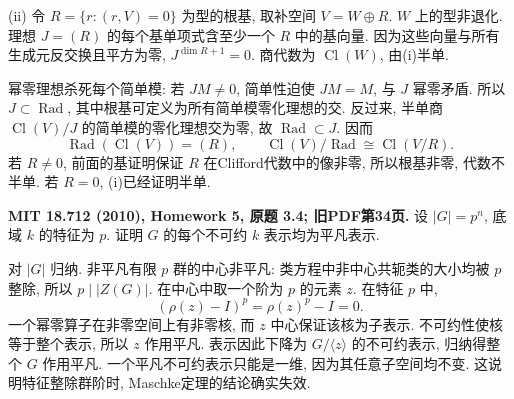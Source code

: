 \begin{solution}
(ii) 令 $R=\{r:(r,V)=0\}$ 为型的根基, 取补空间 $V=W\oplus R$. $W$ 上的型非退化. 理想 $J=(R)$ 的每个基单项式含至少一个 $R$ 中的基向量. 因为这些向量与所有生成元反交换且平方为零, $J^{\dim R+1}=0$. 商代数为 $\operatorname{Cl}(W)$, 由(i)半单.

幂零理想杀死每个简单模: 若 $JM\ne0$, 简单性迫使 $JM=M$, 与 $J$ 幂零矛盾. 所以 $J\subset\operatorname{Rad}$, 其中根基可定义为所有简单模零化理想的交. 反过来, 半单商 $\operatorname{Cl}(V)/J$ 的简单模的零化理想交为零, 故 $\operatorname{Rad}\subset J$. 因而
\[
 \operatorname{Rad}(\operatorname{Cl}(V))=(R),\qquad
 \operatorname{Cl}(V)/\operatorname{Rad}\cong\operatorname{Cl}(V/R).
\]
若 $R\ne0$, 前面的基证明保证 $R$ 在Clifford代数中的像非零, 所以根基非零, 代数不半单. 若 $R=0$, (i)已经证明半单.
\end{solution}

\begin{exercise}\label{hw:3.4}
\textbf{MIT 18.712 (2010), Homework 5, 原题 3.4; 旧PDF第34页.}
设 $|G|=p^n$, 底域 $k$ 的特征为 $p$. 证明 $G$ 的每个不可约 $k$ 表示均为平凡表示.
\end{exercise}
\begin{solution}
对 $|G|$ 归纳. 非平凡有限 $p$ 群的中心非平凡: 类方程中非中心共轭类的大小均被 $p$ 整除, 所以 $p\mid|Z(G)|$. 在中心中取一个阶为 $p$ 的元素 $z$. 在特征 $p$ 中,
\[
 (\rho(z)-I)^p=\rho(z)^p-I=0.
\]
一个幂零算子在非零空间上有非零核, 而 $z$ 中心保证该核为子表示. 不可约性使核等于整个表示, 所以 $z$ 作用平凡. 表示因此下降为 $G/\langle z\rangle$ 的不可约表示, 归纳得整个 $G$ 作用平凡. 一个平凡不可约表示只能是一维, 因为其任意子空间均不变. 这说明特征整除群阶时, Maschke定理的结论确实失效.
\end{solution}


